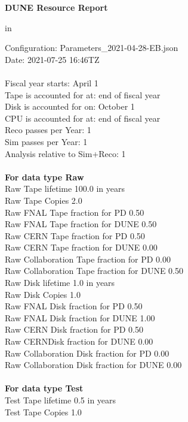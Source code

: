 \documentclass[12pt]{article}
\begin{document}
\parindent=0pt
\setlength{\textwidth=7.0 in}
\setlength{\oddsidemargin=0.00 in}
\setlength{\topmargin=0 in}
\setlength{\textheight=9.5 in}
\centerline{\bf{DUNE Resource Report}} in \par Configuration: Parameters\_2021-04-28-EB.json\\  Date: 2021-07-25 16:46TZ\\   \\  Fiscal year starts: April 1\\ 
Tape is accounted for at: end of fiscal year\\ 
Disk is accounted for on: October 1\\ 
CPU is accounted for at: end of fiscal year\\ 
Reco passes per Year: 1\\
Sim passes per Year: 1\\
Analysis relative to Sim+Reco: 1\\
\pagebreak
\\
{\bf For data type Raw}\\
   Raw Tape lifetime 100.0 in years\\
   Raw Tape Copies   2.0\\
   Raw FNAL Tape fraction for PD  0.50\\
   Raw FNAL Tape fraction for DUNE  0.50\\
   Raw CERN Tape fraction for PD  0.50\\
   Raw CERN Tape fraction for DUNE  0.00\\
   Raw Collaboration Tape fraction for PD  0.00\\
   Raw Collaboration Tape fraction for DUNE  0.50\\
   Raw Disk lifetime   1.0 in years\\
   Raw Disk Copies   1.0\\
   Raw FNAL Disk fraction for PD  0.50\\
   Raw FNAL Disk fraction for DUNE  1.00\\
   Raw CERN Disk fraction for PD  0.50\\
   Raw CERNDisk fraction for DUNE  0.00\\
   Raw Collaboration Disk fraction for PD  0.00\\
   Raw Collaboration Disk fraction for DUNE  0.00\\
\\
{\bf For data type Test}\\
  Test Tape lifetime   0.5 in years\\
  Test Tape Copies   1.0\\
\end{document}
